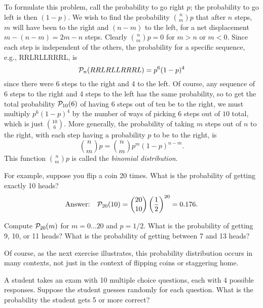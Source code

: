 To formulate this problem, call the probability to go right $p$; the probability to go left is then $(1-p)$.  We wish to find the probability $\binom{n}{m}{p}$ that after $n$ steps, $m$ will have been to the right and $(n-m)$ to the left, for a net displacement $m-(n-m) = 2m-n$ steps.
Clearly $\binom{n}{m}{p} = 0$ for $m>n$ or $m<0$.  Since each step is independent of the others, the probability for a specific sequence, e.g., RRLRLLRRRL, is
\begin{equation}\label{e.one-sequence}
	\mathcal{P}_{n}(RRLRLLRRRL) = p^{6}(1-p)^{4}
\end{equation}
since there were 6 steps to the right and 4 to the left.  Of course, any sequence of 6 steps to the right and 4 steps to the left has the same probability, so to get the total probability $\mathcal{P}_{10}(6)$ of having 6 steps out of ten be to the right, we must multiply $p^{6}(1-p)^{4}$ by the number of ways of picking $6$ steps out of $10$ total, which is just $10\choose6$.  More generally, the probability of taking $m$ steps out of $n$ to the right, with each step having a probability $p$ to be to the right, is
\begin{equation}\label{e.binomial}
	\binom{n}{m}{p} = {n\choose m} p^{m}(1-p)^{n-m}.
\end{equation}
This function $\binom{n}{m}{p}$ is called the \emph{binomial distribution}.

For example, suppose you flip a coin 20 times.  What is the probability of getting exactly 10 heads?
\[
	\textrm{Answer:}\quad\mathcal{P}_{20}(10) = {20\choose10} \left(\frac{1}{2}\right)^{20} = 0.176.
\]
\begin{exercisebox}
\label{e.prob-distribution}
Compute $\mathcal{P}_{20}(m)$ for $m = 0\ldots20$ and $p= 1/2$.  What is the probability of getting 9, 10, or 11 heads?  What is the probability of getting between 7 and 13 heads?
\end{exercisebox}

Of course, as the next exercise illustrates, this probability distribution occurs in many contexts, not just in the context of flipping coins or staggering home.

\begin{exercisebox}
A student takes an exam with 10 multiple choice questions, each with 4 possible responses.  Suppose the student guesses randomly for each question.  What is the probability the student gets 5 or more correct?
\end{exercisebox}

